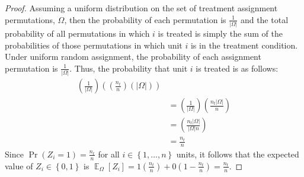 \documentclass[12pt,leqno]{article}
\theoremstyle{newstyle}
\DeclareMathOperator{\E}{\mathbb{E}}
\begin{document}
\begin{proof}
Assuming a uniform distribution on the set of treatment assignment permutations, $\Omega$, then the probability of each permutation is $\frac{1}{\left\lvert\Omega\right\rvert}$ and the total probability of all permutations in which $i$ is treated is simply the sum of the probabilities of those permutations in which unit $i$ is in the treatment condition. Under uniform random assignment, the probability of each assignment permutation is $\frac{1}{\left\lvert\Omega\right\rvert}$. Thus, the probability that unit $i$ is treated is as follows:
\begin{align*}
\left(\frac{1}{\left\lvert\Omega\right\rvert}\right) \left(\left(\frac{n_t}{n}\right)\left(\left\lvert\Omega\right\rvert\right)\right) \\ 
& = \left(\frac{1}{\left\lvert\Omega\right\rvert}\right) \left(\frac{n_t\left\lvert\Omega\right\rvert}{n}\right) \\
& = \left(\frac{n_t\left\lvert\Omega\right\rvert}{\left\lvert\Omega\right\rvert n}\right) \\ 
& = \frac{n_t}{n}  
 \end{align*}
Since $\Pr\left(Z_i = 1\right) = \frac{n_t}{n}$ for all $i \in \left\{1, \dots , n\right\}$ units, it follows that the expected value of $Z_i \in \left\{0, 1\right\}$ is $\E_{\Omega}\left[Z_i\right] = 1\left(\frac{n_t}{n}\right) + 0\left(1 - \frac{n_t}{n}\right) = \frac{n_t}{n}$.
\end{proof}
\end{document}

